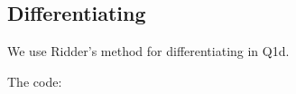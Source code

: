 \subsection{Differentiating}

We use Ridder's method for differentiating in Q1d.

\noindent The code:
